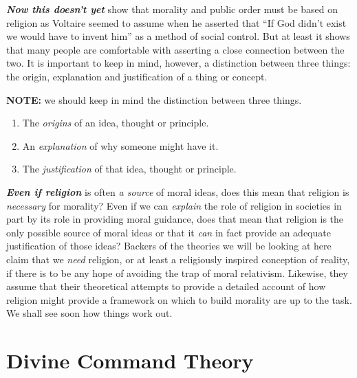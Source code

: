 \documentclass[
  12pt, openany]{book}
\makeatletter
\providecommand{\tightlist}{%
  \setlength{\itemsep}{0pt}\setlength{\parskip}{0pt}}
\newenvironment{kframe}{%
\medskip{}
\setlength{\fboxsep}{.8em}
 \def\at@end@of@kframe{}%
 \ifinner\ifhmode%
  \def\at@end@of@kframe{\end{minipage}}%
  \begin{minipage}{\columnwidth}%
 \fi\fi%
 \def\FrameCommand##1{\hskip\@totalleftmargin \hskip-\fboxsep
 \colorbox{shadecolor}{##1}\hskip-\fboxsep
     \hskip-\linewidth \hskip-\@totalleftmargin \hskip\columnwidth}%
 \MakeFramed {\advance\hsize-\width
   \@totalleftmargin\z@ \linewidth\hsize
   \@setminipage}}%
 {\par\unskip\endMakeFramed%
 \at@end@of@kframe}
\newenvironment{rmdblock}[1]
  {
  \begin{itemize}
  \renewcommand{\labelitemi}{
    \raisebox{-.7\height}[0pt][0pt]{
      {\setkeys{Gin}{width=3em,keepaspectratio}\texttt{[image: img/\#1]}}
    }
  }
  \setlength{\fboxsep}{1em}
  \begin{kframe}
  \item
  }
  {
  \end{kframe}
  \end{itemize}
  }
\newenvironment{note}
  {\begin{rmdblock}{note}}
  {\end{rmdblock}}
\makeatother
\begin{document}
\textbf{\emph{Now this doesn't yet}} show that morality and public order must be based on religion as Voltaire seemed to assume when he asserted that ``If God didn't exist we would have to invent him'' as a method of social control. But at least it shows that many people are comfortable with asserting a close connection between the two. It is important to keep in mind, however, a distinction between three things: the origin, explanation and justification of a thing or concept.

\begin{note}

\textbf{NOTE:} we should keep in mind the distinction between three things.

\begin{enumerate}
\def\labelenumi{\arabic{enumi}.}
\tightlist
\item
  The \emph{origins} of an idea, thought or principle.
\item
  An \emph{explanation} of why someone might have it.
\item
  The \emph{justification} of that idea, thought or principle.
\end{enumerate}

\end{note}

\textbf{\emph{Even if religion}} is often \emph{a source} of moral ideas, does this mean that religion is \emph{necessary} for morality? Even if we can \emph{explain} the role of religion in societies in part by its role in providing moral guidance, does that mean that religion is the only possible source of moral ideas or that it \emph{can} in fact provide an adequate justification of those ideas? Backers of the theories we will be looking at here claim that we \emph{need} religion, or at least a religiously inspired conception of reality, if there is to be any hope of avoiding the trap of moral relativism. Likewise, they assume that their theoretical attempts to provide a detailed account of how religion might provide a framework on which to build morality are up to the task. We shall see soon how things work out.

\hypertarget{divine-command-theory}{%
\section{Divine Command Theory}\label{divine-command-theory}}
\end{document}
